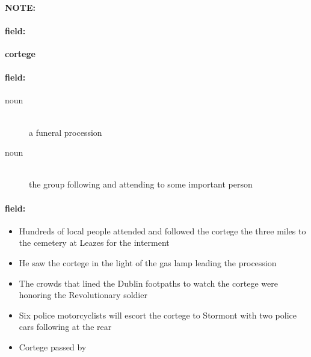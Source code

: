 \documentclass[12pt]{article}
\newenvironment{note}{\paragraph{NOTE:}}{}
\newenvironment{field}{\paragraph{field:}}{}
\begin{document}
\begin{note}
\begin{field}
\textbf{\large cortege}
\end{field}


\begin{field}
\begin{description}
\item[noun] \hfill \\ 
a funeral procession

\item[noun] \hfill \\ 
the group following and attending to some important person

\end{description}
\end{field}

\begin{field}
\begin{itemize}
\item Hundreds of local people attended and followed the cortege the three miles to the cemetery at Leazes for the interment
\item He saw the cortege in the light of the gas lamp leading the procession
\item The crowds that lined the Dublin footpaths to watch the cortege were honoring the Revolutionary soldier
\item Six police motorcyclists will escort the cortege to Stormont with two police cars following at the rear
\item Cortege passed by
\end{itemize}
\end{field}
\end{note}
\end{document}
